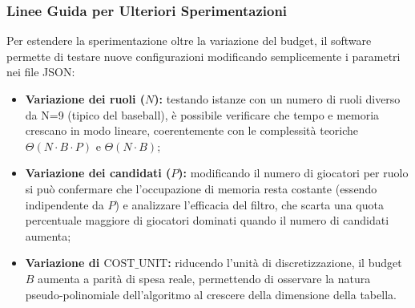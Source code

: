 \subsubsection{Linee Guida per Ulteriori Sperimentazioni}
Per estendere la sperimentazione oltre la variazione del budget, il software permette di testare nuove configurazioni modificando semplicemente i parametri nei file JSON:
\begin{itemize}
	\item \textbf{Variazione dei ruoli ($N$):} testando istanze con un numero di ruoli diverso da N=9 (tipico del baseball), è possibile verificare che tempo e memoria crescano in modo lineare, coerentemente con le complessità teoriche $\Theta(N \cdot B \cdot P)$ e $\Theta(N \cdot B)$;
	\item \textbf{Variazione dei candidati ($P$):} modificando il numero di giocatori per ruolo si può confermare che l'occupazione di memoria resta costante (essendo indipendente da $P$) e analizzare l'efficacia del filtro, che scarta una quota percentuale maggiore di giocatori dominati quando il numero di candidati aumenta;
	\item \textbf{Variazione di $\text{COST\_UNIT}$:} riducendo l'unità di discretizzazione, il budget $B$ aumenta a parità di spesa reale, permettendo di osservare la natura pseudo-polinomiale dell'algoritmo al crescere della dimensione della tabella.
\end{itemize}
